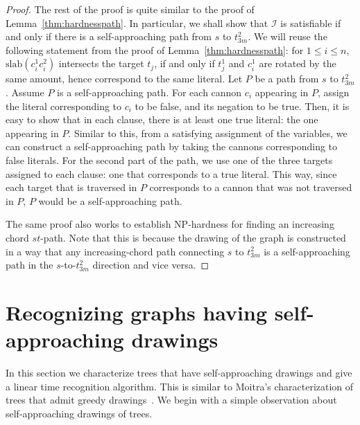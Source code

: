 \documentclass[11pt]{article}
\newcommand{\perpslab}[1]{\mathrm{slab}(#1)}
\newcommand{\changed}[1]{#1}
\newcommand{\ignore}[1]{}
\begin{document}
\begin{proof}
The rest of the proof is quite similar to the proof of Lemma~\ref{thm:hardnesspath}.  In particular, we shall show that $\mathcal{I}$ is satisfiable if and only if there is a self-approaching path from $s$ to $t_{3m}^2$.  We will reuse the following statement from the proof of Lemma~\ref{thm:hardnesspath}: for $1\leq i\leq n$, $\perpslab{c_i^1c_i^2}$ intersects the target $t_j$, if and only if $t_j^1$ and $c_i^1$ are rotated by the same amount, hence correspond to the same literal. Let $P$ be a path from $s$ to $t_{3m}^2$. Assume $P$ is a self-approaching path. For each cannon $c_i$ appearing in $P$, assign the literal corresponding to $c_i$ to be false, and its negation to be true. Then, it is easy to show that in each clause, there is at least one true literal: the one appearing in $P$. Similar to this, from a satisfying assignment of the variables, we can construct a self-approaching path by taking the cannons corresponding to false literals. For the second part of the path, we use one of the three targets assigned to each clause: one that corresponds to a true literal. This way, since each target that is traversed in $P$ corresponds to a cannon that was not traversed in $P$, $P$ would be a self-approaching path.

The same proof also works to establish NP-hardness for finding an increasing chord $st$-path.  Note that this is because the drawing of the graph is constructed in a way that any increasing-chord path connecting $s$ to $t_{3m}^2$ is a self-approaching path in the $s$-to-$t_{3m}^2$ direction and vice versa.
\end{proof}


\ignore{To prove this theorem, we reduce from 3SAT.  Our proof uses similar `cannons' and `targets' to those used in the proof of Theorem~\ref{thm:hardnesspath}, but this time, the cannons correspond to variable assignments and the targets correspond to literals in clauses.}



\section{Recognizing graphs having self-approaching drawings}
\label{sec:SADrawability}






In this section
{\changed we characterize trees that have self-approaching drawings and give a linear time recognition algorithm.
This is similar to Moitra's characterization of trees that admit greedy drawings~\cite{Moitra:Thesis:2009}.}  We begin with a simple observation about self-approaching drawings of trees.
\end{document}
